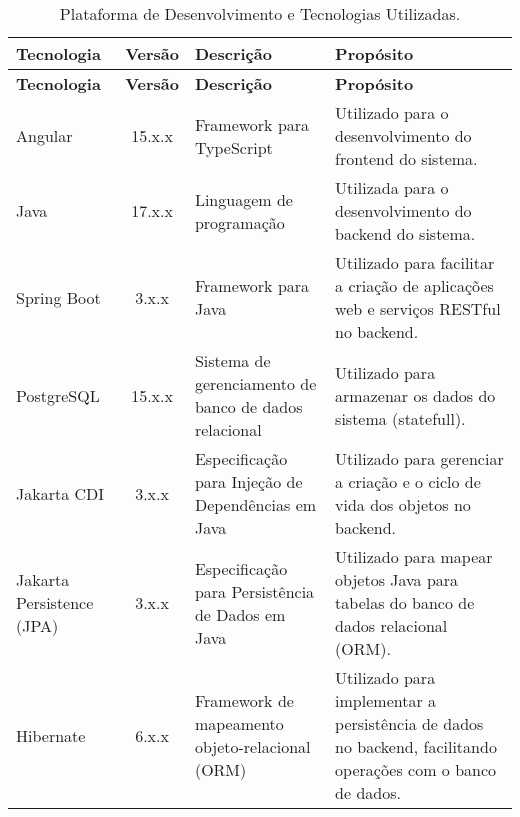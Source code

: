\begin{footnotesize}
	\begin{longtable}{|p{2.5cm}|c|p{5cm}|p{5.5cm}|}
		\caption{Plataforma de Desenvolvimento e Tecnologias Utilizadas.}
		\label{tabela-plataforma}                                                                                                                                                                                        \\\hline

		\rowcolor{lightgray}
		\textbf{Tecnologia}       & \textbf{Versão} & \textbf{Descrição}                                    & \textbf{Propósito}                                                                                         \\\hline
		\endfirsthead
		\hline
		\rowcolor{lightgray}
		\textbf{Tecnologia}       & \textbf{Versão} & \textbf{Descrição}                                    & \textbf{Propósito}                                                                                         \\\hline
		\endhead

		Angular                   & 15.x.x          & Framework para TypeScript                             & Utilizado para o desenvolvimento do frontend do sistema.                                                   \\ \hline
		Java                      & 17.x.x          & Linguagem de programação                              & Utilizada para o desenvolvimento do backend do sistema.                                                    \\ \hline
		Spring Boot               & 3.x.x           & Framework para Java                                   & Utilizado para facilitar a criação de aplicações web e serviços RESTful no backend.                        \\ \hline
		PostgreSQL                & 15.x.x          & Sistema de gerenciamento de banco de dados relacional & Utilizado para armazenar os dados do sistema (statefull).                                                  \\ \hline
		Jakarta CDI               & 3.x.x           & Especificação para Injeção de Dependências em Java    & Utilizado para gerenciar a criação e o ciclo de vida dos objetos no backend.                               \\ \hline
		Jakarta Persistence (JPA) & 3.x.x           & Especificação para Persistência de Dados em Java      & Utilizado para mapear objetos Java para tabelas do banco de dados relacional (ORM).                        \\ \hline
		Hibernate                 & 6.x.x           & Framework de mapeamento objeto-relacional (ORM)       & Utilizado para implementar a persistência de dados no backend, facilitando operações com o banco de dados. \\ \hline
	\end{longtable}
\end{footnotesize}




